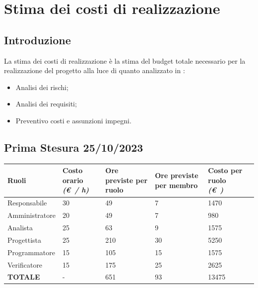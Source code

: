 \documentclass{article}
\begin{document}
\section{Stima dei costi di realizzazione}
\subsection{Introduzione}
La stima dei costi di realizzazione è la stima del budget totale necessario per la realizzazione del progetto alla luce di quanto analizzato in :
\begin{itemize}
    \item Analisi dei rischi;
    \item Analisi dei requisiti;
    \item Preventivo costi e assunzioni impegni.
\end{itemize}

\subsection{Prima Stesura 25/10/2023}
\begin{center}
        
    \begin{tabular}{|C{3cm}|C{2cm}|C{2cm}|C{2cm}|C{2cm}|C{2cm}|}
        \hline

        \textbf{Ruoli} & \textbf{Costo orario} \linebreak \textit{(\euro\ / h)} & \textbf{Ore previste per ruolo} & \textbf{Ore previste per membro} & \textbf{Costo per ruolo} \linebreak \textit{(\euro\ )} \\
        \hline\hline
        
        Responsabile & 30 & 49 & 7 & 1470 \\
        \hline
        
        Amministratore & 20 & 49 & 7 & 980 \\
        \hline
        
        Analista & 25 & 63 & 9 & 1575 \\
        \hline 
        
        Progettista & 25 & 210 & 30 & 5250 \\ 
        \hline
        
        Programmatore & 15 & 105 & 15 & 1575 \\
        \hline
        
        Verificatore & 15 & 175 & 25 & 2625 \\
        \hline\hline
        
        \textbf{TOTALE} & - & 651 & 93 & 13475 \\
        \hline
    \end{tabular}
    \end{center}
\end{document}
